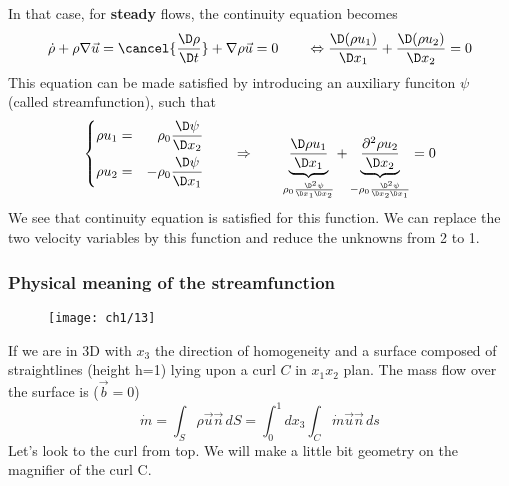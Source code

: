 		In that case, for \textbf{steady} flows, the continuity equation becomes 
		\begin{equation}
			\dot{\rho} + \rho \nabla \vec{u} = \cancel{\frac{\D \rho}{\D t}} + \nabla \rho \vec{u} = 0 \qquad \Leftrightarrow \frac{\D (\rho u_1)}{\D x_1} + \frac{\D (\rho u_2)}{\D x_2} = 0
		\end{equation}
		This equation can be made satisfied by introducing an auxiliary funciton $\psi$ (called streamfunction), such that  
		\begin{equation}
		\left\{
		\begin{aligned}
			\rho u_1 &= &\rho _0 \frac{\D\psi}{\D x_2}\\
			\rho u_2 &= &-\rho _0 \frac{\D\psi}{\D x_1}
		\end{aligned}
		\right.
		\qquad \Rightarrow \qquad \underbrace{\frac{\D \rho u_1}{\D x_1}}_{\rho _0 \frac{\D ^2 \psi}{\D x_1 \D x_2}} + \underbrace{\frac{\partial ^2 \rho u_2}{\D x_2}}_{-\rho _0 \frac{\D ^2 \psi}{\D x_2 \D x_1}} = 0
		\label{eq:1.107}
		\end{equation}
		We see that continuity equation is satisfied for this function.  We can replace the two velocity variables by this function and reduce the unknowns from 2 to 1. 
		
		\newpage
		\subsubsection{Physical meaning of the streamfunction}
			\begin{wrapfigure}[8]{l}{2.8cm}
			\vspace{-5mm}
			\texttt{[image: ch1/13]}
			\label{fig:1.13}
			\end{wrapfigure}
			If we are in 3D with $x_3$ the direction of homogeneity and a surface composed of straightlines (height h=1) lying upon a curl $C$ in $x_1 x_2$ plan. The mass flow over the surface is ($\vec{b} = 0$)
			\begin{equation}
				\dot{m} = \int _S \rho \vec{u}\vec{n}\, dS = \int _0 ^1 dx_3 \int _C \dot{m}\vec{u}\vec{n}\, ds
				\label{eq:108}
			\end{equation}
		Let's look to the curl from top. We will make a little bit geometry on the magnifier of the curl C. \\
		

